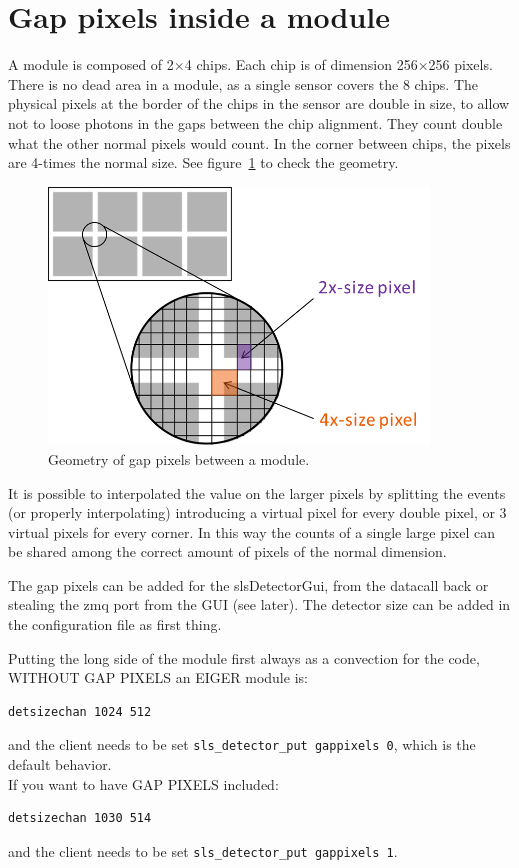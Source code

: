 \documentclass{article}
\begin{document}
\section{Gap pixels inside a module}
A module is composed of 2$\times$4 chips. Each chip is of dimension 256$\times$256 pixels. There is no dead area in a module, as a single sensor covers the 8 chips. The physical pixels at the border of the chips in the sensor are double in size, to allow not to loose photons in the gaps between the chip alignment. They count double what the other normal pixels would count. In the corner between chips, the pixels are 4-times the normal size. See figure~\ref{fgappix} to check the geometry.

\begin{figure}[t]
\begin{center}
\includegraphics[width=0.9\textwidth]{GapPixels}
\end{center}
\caption{Geometry of gap pixels between a module.}
\label{fgappix}
\end{figure}

It is possible to interpolated the value on the larger pixels by splitting the events (or properly interpolating) introducing a virtual pixel for every double pixel, or 3 virtual pixels for every corner. In this way the counts of a single large pixel can be shared among the correct amount of pixels of the normal dimension.     

The gap pixels can be added for the slsDetectorGui, from the datacall back or stealing the zmq port from the GUI (see later). The detector size can be added in the configuration file as first thing. 

Putting the long side of the module first always as a convection for the code, WITHOUT GAP PIXELS an EIGER module is:
\begin{verbatim}
detsizechan 1024 512 
\end{verbatim}
and the client needs to be set {\tt{sls\_detector\_put  gappixels 0}}, which is the default behavior.\\
If you want to have GAP PIXELS included: 
\begin{verbatim}
detsizechan 1030 514 
\end{verbatim}
and the client needs to be set {\tt{sls\_detector\_put  gappixels 1}}.
\end{document}
